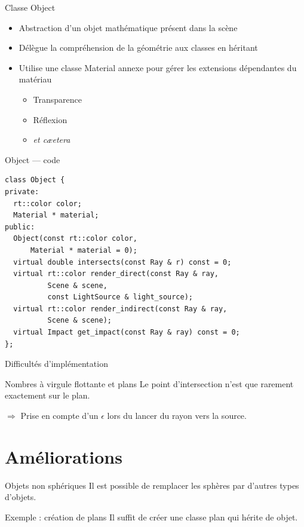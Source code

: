 \documentclass{beamer}
\begin{document}
\begin{frame}{Classe Object}
    \begin{itemize}
        \item Abstraction d'un objet mathématique présent dans la scène
        \item Délègue la compréhension de la géométrie aux classes en héritant
        \item Utilise une classe Material annexe pour gérer les extensions dépendantes du matériau
            \begin{itemize}
                \item Transparence
                \item Réflexion
                \item \emph{et cæetera}
            \end{itemize}
    \end{itemize}
\end{frame}

\begin{frame}[fragile]{Object — code}
    \begin{lstlisting}
class Object {
private:
  rt::color color;
  Material * material;
public:
  Object(const rt::color color,
      Material * material = 0);
  virtual double intersects(const Ray & r) const = 0;
  virtual rt::color render_direct(const Ray & ray,
          Scene & scene,
          const LightSource & light_source);
  virtual rt::color render_indirect(const Ray & ray,
          Scene & scene);
  virtual Impact get_impact(const Ray & ray) const = 0;
};
\end{lstlisting}
\end{frame}

\begin{frame}{Difficultés d'implémentation}
\begin{block}{Nombres à virgule flottante et plans}
    Le point d'intersection n'est que rarement exactement sur le plan.

    $\Rightarrow$ Prise en compte d'un $\epsilon$ lors du lancer du rayon vers la source.
\end{block}
\end{frame}

\section{Améliorations}

\begin{frame}{Objets non sphériques}
Il est possible de remplacer les sphères par d'autres types d'objets.

\begin{block}{Exemple : création de plans}
Il suffit de créer une classe plan qui hérite de objet.
\end{block}
\end{frame}
\end{document}
